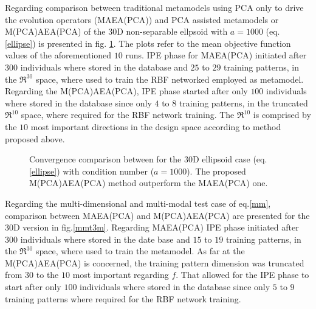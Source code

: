 Regarding comparison between traditional metamodels using PCA only to drive the evolution operators (MAEA(PCA)) and PCA assisted metamodels  or M(PCA)AEA(PCA) of the 30D non-separable ellpsoid with $a=1000$ (eq. \ref{ellipse}) is presented in fig. \ref{Ellt3-m}. The plots refer to the mean objective function values of the aforementioned $10$ runs. IPE phase for MAEA(PCA) initiated after $300$ individuals where stored in the database and $25$ to $29$ training patterns, in the $\Re^{30}$ space, where used to train the RBF networked employed as metamodel. Regarding the M(PCA)AEA(PCA), IPE phase started after only $100$ individuals where stored in the database since only $4$ to $8$ training patterns, in the truncated  $\Re^{10}$  space, where required for the RBF network training. The $\Re^{10}$ is comprised by the $10$ most important directions in the design space according to method proposed above. 

\begin{figure}[h!]
\begin{minipage}[b]{1\linewidth}
 \centering
\end{minipage}
\caption{Convergence comparison between for the 30D ellipsoid case (eq. \ref{ellipse}) with condition number ($a = 1000$). The proposed M(PCA)AEA(PCA) method outperform the MAEA(PCA) one.} 
\label{Ellt3-m}
\end{figure}


Regarding the multi-dimensional and multi-modal test case of eq.\ref{mm}, comparison between MAEA(PCA) and M(PCA)AEA(PCA) are presented for the 30D version in fig.\ref{mmt3m}. Regarding MAEA(PCA)  IPE phase initiated after $300$ individuals where stored in the date base and $15$ to $19$ training patterns, in the $\Re^{30}$ space, where used to train the  metamodel. As far at the M(PCA)AEA(PCA) is concerned, the training pattern dimension was truncated from $30$ to the $10$ most important regarding $f$. That allowed for the  IPE phase to start after only $100$ individuals where stored in the database since only $5$ to $9$ training patterns where required for the RBF network training.

